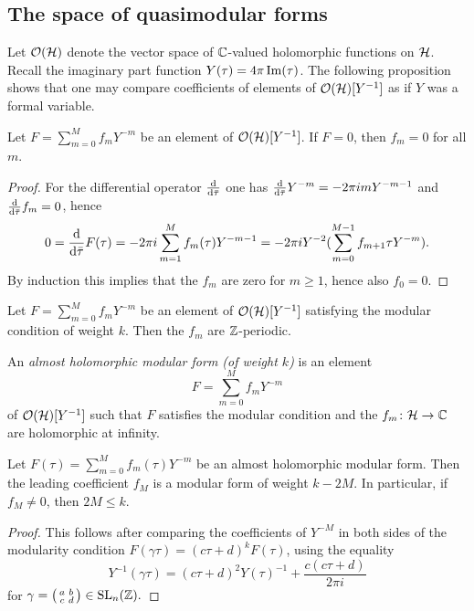 \subsection{The space of quasimodular forms}

Let $\mathcal{O}(\mathcal{H})$ denote the vector space of $\mathbb{C}$-valued holomorphic functions on $\mathcal{H}$. Recall the imaginary part function $Y(\tau)=4\pi\operatorname{Im}(\tau)$. The following proposition shows that one may compare coefficients of elements of $\mathcal{O}(\mathcal{H})[Y^{-1}]$ as if $Y$ was a formal variable.

\begin{prop}
 Let $F=\sum_{m=0}^Mf_mY^{-m}$ be an element of $\mathcal{O}(\mathcal{H})[Y^{-1}]$. If $F=0$, then $f_m=0$ for all $m$.
\end{prop}
\begin{proof}
 For the differential operator $\frac{\mathrm{d}}{\mathrm{d}\bar{\tau}}$ one has $\frac{\mathrm{d}}{\mathrm{d}\bar{\tau}}Y^{-m}=-2\pi imY^{-m-1}$ and $\frac{\mathrm{d}}{\mathrm{d}\bar{\tau}}f_m=0$, hence \[0=\frac{\mathrm{d}}{\mathrm{d}\bar{\tau}}F(\tau)=-2\pi i\sum_{m=1}^{M}f_m(\tau)Y^{-m-1}=-2\pi iY^{-2}(\sum_{m=0}^{M-1}f_{m+1}{\tau}Y^{-m}).\]
 By induction this implies that the $f_m$ are zero for $m\geq 1$, hence also $f_0=0$.
\end{proof}

\begin{cor}
 Let $F=\sum_{m=0}^Mf_mY^{-m}$ be an element of $\mathcal{O}(\mathcal{H})[Y^{-1}]$ satisfying the modular condition of weight $k$. Then the $f_m$ are $\mathbb{Z}$-periodic.
\end{cor}

\begin{defi}
 An \emph{almost holomorphic modular form (of weight $k$)} is an element
 \[F=\sum_{m=0}^Mf_mY^{-m}\]
 of $\mathcal{O}(\mathcal{H})[Y^{-1}]$ such that $F$ satisfies the modular condition and the
 $f_m\colon \mathcal{H}\to \mathbb{C}$ are holomorphic at infinity.
\end{defi}

\begin{prop}
 Let $F(\tau)=\sum_{m=0}^Mf_m(\tau)Y^{-m}$ be an almost holomorphic modular form. Then the leading coefficient $f_M$ is a modular form of weight $k-2M$. In particular, if $f_M \neq 0$, then $2M \leq k$.
\end{prop}
\begin{proof}
 This follows after comparing the coefficients of $Y^{-M}$ in both sides of the modularity condition $F(\gamma\tau)=(c\tau+d)^kF(\tau)$, using the equality \[Y^{-1}(\gamma\tau)=(c\tau+d)^2Y(\tau)^{-1}+\frac{c(c\tau+d)}{2\pi i}\]
 for $\gamma=
 \bigl(\begin{smallmatrix}
 a&b\\ c&d
 \end{smallmatrix} \bigr)
 \in \operatorname{SL}_n(\mathbb{Z}).$
\end{proof}

